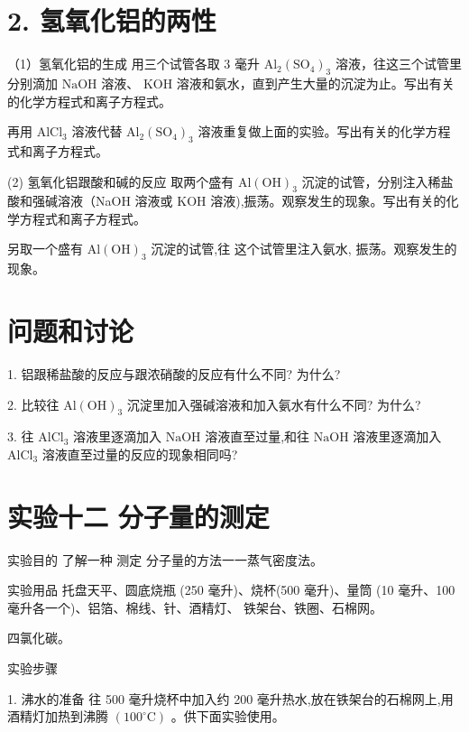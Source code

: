 \documentclass[10pt]{article}
\begin{document}
\section*{2. 氢氧化铝的两性}

（1）氢氧化铝的生成 用三个试管各取 3 毫升 \({\mathrm{{Al}}}_{2}{\left( {\mathrm{{SO}}}_{4}\right) }_{3}\) 溶液，往这三个试管里分别滴加 \(\mathrm{{NaOH}}\) 溶液、 KOH 溶液和氨水，直到产生大量的沉淀为止。写出有关的化学方程式和离子方程式。

再用 \({\mathrm{{AlCl}}}_{3}\) 溶液代替 \({\mathrm{{Al}}}_{2}{\left( {\mathrm{{SO}}}_{4}\right) }_{3}\) 溶液重复做上面的实验。写出有关的化学方程式和离子方程式。

(2) 氢氧化铝跟酸和碱的反应 取两个盛有 \(\mathrm{{Al}}{\left( \mathrm{{OH}}\right) }_{3}\) 沉淀的试管，分别注入稀盐酸和强碱溶液（NaOH 溶液或 \(\mathrm{{KOH}}\) 溶液),振荡。观察发生的现象。写出有关的化学方程式和离子方程式。

另取一个盛有 \(\mathrm{{Al}}{\left( \mathrm{{OH}}\right) }_{3}\) 沉淀的试管,往 这个试管里注入氨水, 振荡。观察发生的现象。

\section*{问题和讨论}

1. 铝跟稀盐酸的反应与跟浓硝酸的反应有什么不同? 为什么?

2. 比较往 \(\mathrm{{Al}}{\left( \mathrm{{OH}}\right) }_{3}\) 沉淀里加入强碱溶液和加入氨水有什么不同? 为什么?

3. 往 \({\mathrm{{AlCl}}}_{3}\) 溶液里逐滴加入 \(\mathrm{{NaOH}}\) 溶液直至过量,和往 \(\mathrm{{NaOH}}\) 溶液里逐滴加入 \({\mathrm{{AlCl}}}_{3}\) 溶液直至过量的反应的现象相同吗?

\section*{实验十二 分子量的测定}

实验目的 了解一种 测定 分子量的方法一一蒸气密度法。

实验用品 托盘天平、圆底烧瓶 (250 毫升)、烧杯(500 毫升)、量筒 (10 毫升、100 毫升各一个)、铝箔、棉线、针、酒精灯、 铁架台、铁圈、石棉网。

四氯化碳。

实验步骤

1. 沸水的准备 往 500 毫升烧杯中加入约 200 毫升热水,放在铁架台的石棉网上,用酒精灯加热到沸腾 \(\left( {{100}^{ \circ }\mathrm{C}}\right)\) 。供下面实验使用。
\end{document}
